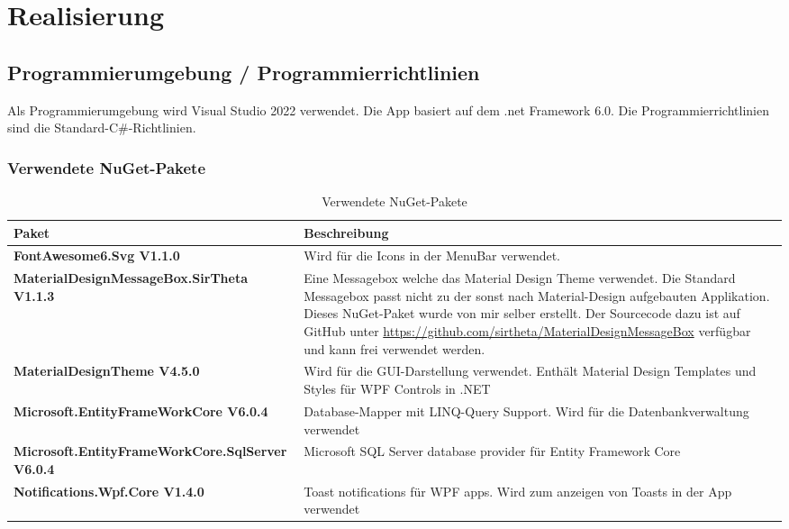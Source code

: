 \section{Realisierung}

\subsection{Programmierumgebung / Programmierrichtlinien}
Als Programmierumgebung wird Visual Studio 2022 verwendet. Die App basiert auf dem .net Framework 6.0. Die Programmierrichtlinien sind die Standard-C\#-Richtlinien.
\subsubsection{Verwendete NuGet-Pakete}
\begin{table}[H]
  \centering
  \setlength\extrarowheight{2pt}
    \begin{tabulary}{1.0\textwidth}{|L|m{10cm}|}
      \hline
      \textbf{Paket}& \textbf{Beschreibung}\\
    \hline
    \textbf{FontAwesome6.Svg V1.1.0} & Wird für die Icons in der MenuBar verwendet.\\
    \hline
    \textbf{MaterialDesignMessageBox.SirTheta V1.1.3} & Eine Messagebox welche das Material Design Theme verwendet. Die Standard Messagebox passt nicht zu der sonst nach Material-Design aufgebauten Applikation. Dieses NuGet-Paket wurde von mir selber erstellt. Der Sourcecode dazu ist auf GitHub unter \href{https://github.com/sirtheta/MaterialDesignMessageBox}{https://github.com/sirtheta/MaterialDesignMessageBox} verfügbar und kann frei verwendet werden.\\
    \hline
    \textbf{MaterialDesignTheme V4.5.0} & Wird für die GUI-Darstellung verwendet. Enthält Material Design Templates und Styles für WPF Controls in .NET\\
    \hline
    \textbf{Microsoft.EntityFrameWorkCore V6.0.4} & Database-Mapper mit LINQ-Query Support. Wird für die Datenbankverwaltung verwendet\\
    \hline
    \textbf{Microsoft.EntityFrameWorkCore.SqlServer V6.0.4} & Microsoft SQL Server database provider für Entity Framework Core\\
    \hline
    \textbf{Notifications.Wpf.Core V1.4.0} & Toast notifications für WPF apps. Wird zum anzeigen von Toasts in der App verwendet \\
    \hline
\end{tabulary}
\caption{Verwendete NuGet-Pakete}
\end{table}


